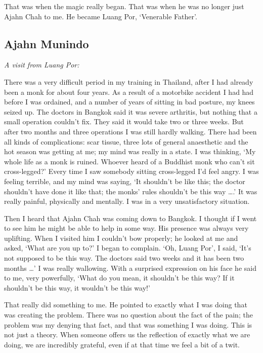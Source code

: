 That was when the magic really began. That was when he was no longer
just Ajahn Chah to me. He became Luang Por, `Venerable Father'. 

\subsection{Ajahn Munindo}

\emph{A visit from Luang Por:}

There was a very difficult period in my training in Thailand, after I
had already been a monk for about four years. As a result of a motorbike
accident I had had before I was ordained, and a number of years of
sitting in bad posture, my knees seized up. The doctors in Bangkok said
it was severe arthritis, but nothing that a small operation couldn't
fix. They said it would take two or three weeks. But after two months
and three operations I was still hardly walking. There had been all
kinds of complications: scar tissue, three lots of general anaesthetic
and the hot season was getting at me; my mind was really in a state. I
was thinking, `My whole life as a monk is ruined. Whoever heard of a
Buddhist monk who can't sit cross-legged?' Every time I saw somebody
sitting cross-legged I'd feel angry. I was feeling terrible, and my mind
was saying, `It shouldn't be like this; the doctor shouldn't have done
it like that; the monks' rules shouldn't be this way \ldots{}.' It was
really painful, physically and mentally. I was in a very unsatisfactory
situation. 

Then I heard that Ajahn Chah was coming down to Bangkok. I thought if I
went to see him he might be able to help in some way. His presence was
always very uplifting. When I visited him I couldn't bow properly; he
looked at me and asked, `What are you up to?' I began to complain. `Oh, 
Luang Por', I said, `It's not supposed to be this way. The doctors said
two weeks and it has been two months \ldots{}' I was really wallowing. 
With a surprised expression on his face he said to me, very powerfully, 
`What do you mean, it shouldn't be this way? If it shouldn't be
this way, it wouldn't be this way!'

That really did something to me. He pointed to exactly what I was doing
that was creating the problem. There was no question about the fact of
the pain; the problem was my denying that fact, and that was something I
was doing. This is not just a theory. When someone offers us the
reflection of exactly what we are doing, we are incredibly grateful, 
even if at that time we feel a bit of a twit. 

